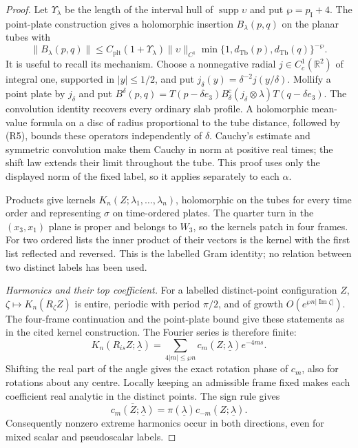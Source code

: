 \documentclass[11pt,letterpaper,reqno]{amsart}
\theoremstyle{definition}
\theoremstyle{remark}
\begin{document}
\begin{proof}
Let $\Upsilon_\lambda$ be the length of the interval
hull of $\operatorname{supp}\upsilon$ and put
$\wp=p_{\mathrm I}+4$.  The point-plate construction
gives a holomorphic insertion $B_\lambda(p,q)$ on
the planar tubes with
\[
 \|B_\lambda(p,q)\|\le
 C_{\mathrm{plt}}(1+\Upsilon_\lambda)
 \|\upsilon\|_{C^1}
 \min\{1,d_{\mathrm{Tb}}(p),d_{\mathrm{Tb}}(q)\}^{-\wp}.
\]
It is useful to recall its mechanism. Choose a nonnegative radial
$j\in C_c^1(\mathbb R^2)$ of integral one, supported in $|y|\le1/2$,
and put $j_\delta(y)=\delta^{-2}j(y/\delta)$.
Mollify a point plate by $j_\delta$ and put
$B^\delta(p,q)=T(p-\delta e_3)
B_\delta^{\mathrm c}(j_\delta\otimes\lambda)T(q-\delta e_3)$.
The convolution identity recovers every ordinary slab
profile.  A holomorphic mean-value formula on a disc
of radius proportional to the tube distance, followed
by (R5), bounds these operators independently of
$\delta$.  Cauchy's estimate and symmetric convolution
make them Cauchy in norm at positive real times;
the shift law extends their limit throughout the tube.
This proof uses only the displayed norm of the fixed
label, so it applies separately to each $\alpha$.

Products give kernels
$K_n(Z;\lambda_1,\ldots,\lambda_n)$, holomorphic on
the tubes for every time order and representing
$\sigma$ on time-ordered plates.  The quarter turn
in the $(x_3,x_1)$ plane is proper and belongs to
$W_3$, so the kernels patch in four frames.
For two ordered lists the inner product of their
vectors is the kernel with the first list reflected
and reversed.  This is the labelled Gram identity;
no relation between two distinct labels has been used.

\emph{Harmonics and their top coefficient.}
For a labelled distinct-point configuration $Z$,
$\zeta\mapsto K_n(R_\zeta Z)$ is entire, periodic
with period $\pi/2$, and of growth
$O(e^{\wp n|\operatorname{Im}\zeta|})$.
The four-frame continuation and the point-plate
bound give these statements as in the cited kernel
construction.  The Fourier series is therefore finite:
\[
 K_n(R_{is}Z;\underline\lambda)
 =\sum_{4|m|\le\wp n}c_m(Z;\underline\lambda)e^{-4ms}.
\]
Shifting the real part of the angle gives the exact
rotation phase of $c_m$, also for rotations about any
centre.  Locally keeping an admissible frame fixed
makes each coefficient real analytic in the distinct
points.  The sign rule gives
\[
 \overline{c_m(Z;\underline\lambda)}
                =\pi(\underline\lambda)c_{-m}(Z;\underline\lambda).
\]
Consequently nonzero extreme harmonics occur in both
directions, even for mixed scalar and pseudoscalar labels.


\end{proof}
\end{document}

